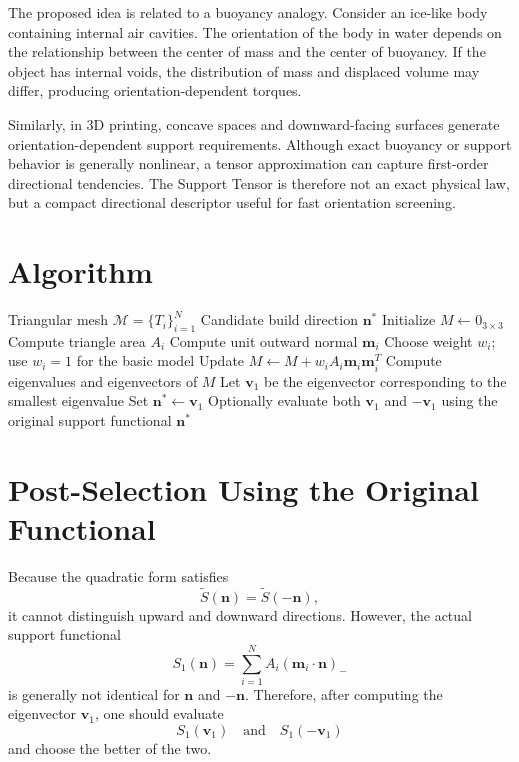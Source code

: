 \documentclass[11pt,a4paper]{article}
\begin{document}
The proposed idea is related to a buoyancy analogy.
Consider an ice-like body containing internal air cavities.
The orientation of the body in water depends on the relationship between the center of mass and the center of buoyancy.
If the object has internal voids, the distribution of mass and displaced volume may differ, producing orientation-dependent torques.

Similarly, in 3D printing, concave spaces and downward-facing surfaces generate orientation-dependent support requirements.
Although exact buoyancy or support behavior is generally nonlinear, a tensor approximation can capture first-order directional tendencies.
The Support Tensor is therefore not an exact physical law, but a compact directional descriptor useful for fast orientation screening.

\section{Algorithm}

\begin{algorithm}
\caption{Support Tensor-Based Build Direction Estimation}
\begin{algorithmic}[1]
\Require Triangular mesh $\mathcal M=\{T_i\}_{i=1}^{N}$
\Ensure Candidate build direction $\bm n^\ast$
\State Initialize $M\leftarrow 0_{3\times 3}$
    \State Compute triangle area $A_i$
    \State Compute unit outward normal $\bm m_i$
    \State Choose weight $w_i$; use $w_i=1$ for the basic model
    \State Update $M\leftarrow M+w_i A_i\bm m_i\bm m_i^T$
\EndFor
\State Compute eigenvalues and eigenvectors of $M$
\State Let $\bm v_1$ be the eigenvector corresponding to the smallest eigenvalue
\State Set $\bm n^\ast\leftarrow \bm v_1$
\State Optionally evaluate both $\bm v_1$ and $-\bm v_1$ using the original support functional
\State \Return $\bm n^\ast$
\end{algorithmic}
\end{algorithm}

\section{Post-Selection Using the Original Functional}

Because the quadratic form satisfies
\[
\widetilde S(\bm n)=\widetilde S(-\bm n),
\]
it cannot distinguish upward and downward directions.
However, the actual support functional
\[
S_1(\bm n)
=
\sum_{i=1}^{N}
A_i
(\bm m_i\cdot \bm n)_-
\]
is generally not identical for $\bm n$ and $-\bm n$.
Therefore, after computing the eigenvector $\bm v_1$, one should evaluate
\[
S_1(\bm v_1)
\quad\text{and}\quad
S_1(-\bm v_1)
\]
and choose the better of the two.
\end{document}
